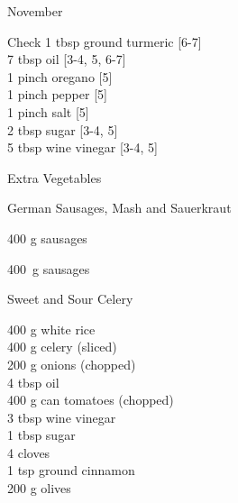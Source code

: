 \begin{menu}{November}
\begin{shoppinglist}{Check}
      1 tbsp ground turmeric 
        {\scriptsize[6-7]}\\
      7 tbsp oil 
        {\scriptsize[3-4, 5, 6-7]}\\
      1 pinch oregano 
        {\scriptsize[5]}\\
      1 pinch pepper 
        {\scriptsize[5]}\\
      1 pinch salt 
        {\scriptsize[5]}\\
      2 tbsp sugar 
        {\scriptsize[3-4, 5]}\\
      5 tbsp wine vinegar 
        {\scriptsize[3-4, 5]}\\
      \end{shoppinglist}%
      \begin{shoppinglist}{Extra Vegetables}
      \end{shoppinglist}%
      \par\vfil %
    \vfil\clearpage
  
    \begin{recipe}{2}{German Sausages, Mash and Sauerkraut}%
		\begin{ingredients}
		400 g sausages  \\
	
		\end{ingredients}
	
    \begin{instructions}
    \item 400~g  sausages
    \end{instructions}
    \end{recipe}%
  
    \begin{recipe}{2}{Sweet and Sour Celery}%
		\begin{ingredients}
		400 g white rice  \\
	400 g celery (sliced) \\
	200 g onions (chopped) \\
	4 tbsp oil  \\
	400 g can tomatoes (chopped) \\
	3 tbsp wine vinegar  \\
	1 tbsp sugar  \\
	4  cloves  \\
	1 tsp ground cinnamon  \\
	200 g olives  \\
	

\end{ingredients}
\end{recipe}
\end{menu}
